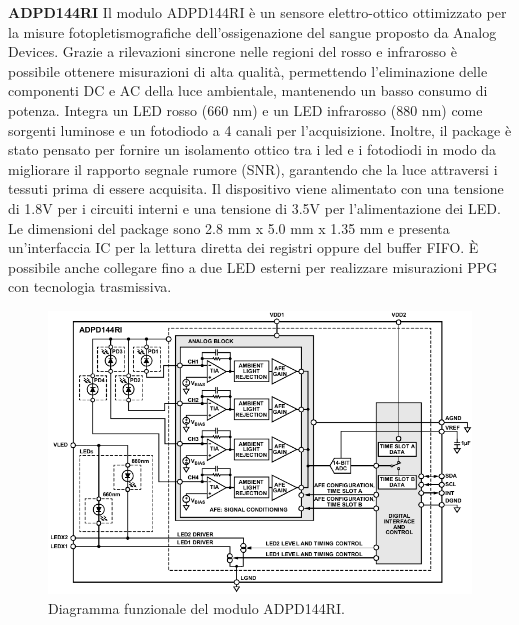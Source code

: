 \textbf{ADPD144RI} Il modulo ADPD144RI è un sensore elettro-ottico ottimizzato per la misure fotopletismografiche dell'ossigenazione del sangue proposto da Analog Devices\cite{AnalogDevicesADPD144RI}. Grazie a rilevazioni sincrone nelle regioni del rosso e infrarosso è possibile ottenere misurazioni di alta qualità, permettendo l'eliminazione delle componenti DC e AC della luce ambientale, mantenendo un basso consumo di potenza. Integra un LED rosso (660 nm) e un LED infrarosso (880 nm) come sorgenti luminose e un fotodiodo a 4 canali per l'acquisizione. Inoltre, il package è stato pensato per fornire un isolamento ottico tra i led e i fotodiodi in modo da migliorare il rapporto segnale rumore (SNR), garantendo che la luce attraversi i tessuti prima di essere acquisita. Il dispositivo viene alimentato con una tensione di 1.8V per i circuiti interni e una tensione di 3.5V per l'alimentazione dei LED. Le dimensioni del package sono 2.8 mm x 5.0 mm x 1.35 mm e presenta un'interfaccia IC per la lettura diretta dei registri oppure del buffer FIFO. \`E possibile anche collegare fino a due LED esterni per realizzare misurazioni PPG con tecnologia trasmissiva.
\begin{figure}[b]
	\centering
	\includegraphics[width=0.8\linewidth]{ImageFiles/Fotopletismografia/ADPD144RIBlockDiagram}
	\caption{Diagramma funzionale del modulo ADPD144RI.}
	\label{fig:ADPD144RIBlockDiagram}
\end{figure}
\pagebreak

